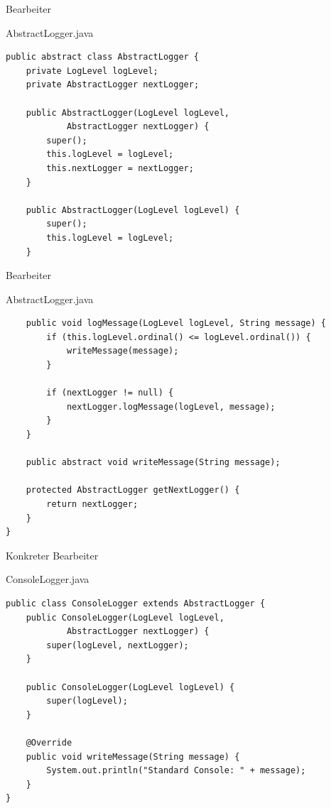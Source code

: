 \begin{frame}[fragile]{Bearbeiter}
	\begin{exampleblock}{AbstractLogger.java}
 		\begin{lstlisting}
public abstract class AbstractLogger {
	private LogLevel logLevel;
	private AbstractLogger nextLogger;
	
	public AbstractLogger(LogLevel logLevel, 
			AbstractLogger nextLogger) {
		super();
		this.logLevel = logLevel;
		this.nextLogger = nextLogger;
	}
	
	public AbstractLogger(LogLevel logLevel) {
		super();
		this.logLevel = logLevel;
	}
 		\end{lstlisting}
 	\end{exampleblock}
\end{frame}

\begin{frame}[fragile]{Bearbeiter}
	\begin{exampleblock}{AbstractLogger.java}
 		\begin{lstlisting}
	public void logMessage(LogLevel logLevel, String message) {
		if (this.logLevel.ordinal() <= logLevel.ordinal()) {
			writeMessage(message);
		}
		
		if (nextLogger != null) {
			nextLogger.logMessage(logLevel, message);
		}
	}
	
	public abstract void writeMessage(String message);
	
	protected AbstractLogger getNextLogger() {
		return nextLogger;
	}
} 		    
 		\end{lstlisting}
 	\end{exampleblock}
\end{frame}

\begin{frame}[fragile]{Konkreter Bearbeiter}
	\begin{exampleblock}{ConsoleLogger.java}
 		\begin{lstlisting}
public class ConsoleLogger extends AbstractLogger {
	public ConsoleLogger(LogLevel logLevel, 
			AbstractLogger nextLogger) {
		super(logLevel, nextLogger);
	}
	
	public ConsoleLogger(LogLevel logLevel) {
		super(logLevel);
	}
	
	@Override
	public void writeMessage(String message) {
		System.out.println("Standard Console: " + message);
	}
}
        \end{lstlisting}
 	\end{exampleblock}
\end{frame}

